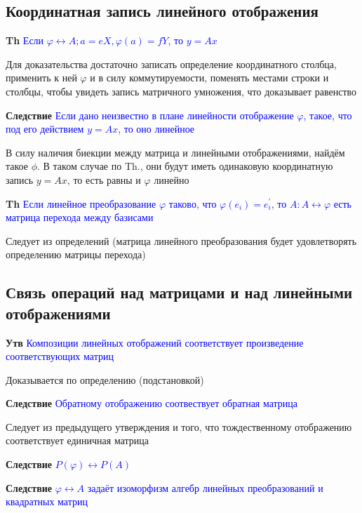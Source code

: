 \documentclass[a4paper, 14pt]{article}
\begin{document}
    \subsection{Координатная запись линейного отображения}

    \textbf{Th} \textcolor{blue}{Если $\varphi \leftrightarrow A; a = eX, \varphi(a) = fY$, то $y = Ax$}

    Для доказательства достаточно записать определение координатного столбца, применить к ней $\varphi$ и в силу
    коммутируемости, поменять местами строки и столбцы, чтобы увидеть запись матричного умножения, что доказывает
    равенство

    \textbf{Следствие} \textcolor{blue}{Если дано неизвестно в плане линейности отображение $\varphi$, такое, что под
    его действием $y = Ax$, то оно линейное}

    В силу наличия биекции между матрица и линейными отображениями, найдём такое $\phi$.
    В таком случае по Th., они будут иметь одинаковую координатную запись $y = Ax$, то есть равны и $\varphi$ линейно

    \textbf{Th} \textcolor{blue}{Если линейное преобразование $\varphi$ таково, что $\varphi(e_i) = e_i^{'}$, то
        $A: A \leftrightarrow \varphi$ есть матрица перехода между базисами}

    Следует из определений (матрица линейного преобразования будет удовлетворять определению матрицы перехода)

    \subsection{Связь операций над матрицами и над линейными отображениями}

    \textbf{Утв} \textcolor{blue}{Композиции линейных отображений соответствует произведение соответствующих матриц}

    Доказывается по определению (подстановкой)

    \textbf{Следствие} \textcolor{blue}{Обратному отображению соотвествует обратная матрица}

    Следует из предыдущего утверждения и того, что тождественному отображению соответствует единичная матрица

    \textbf{Следствие} \textcolor{blue}{$P(\varphi) \leftrightarrow P(A)$}

    \textbf{Следствие} \textcolor{blue}{$\varphi \leftrightarrow A$ задаёт изоморфизм алгебр линейных преобразований
    и квадратных матриц}
\end{document}
